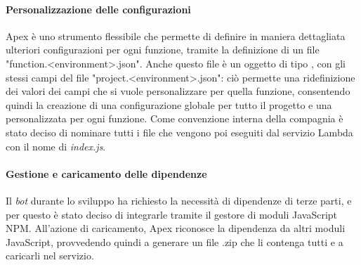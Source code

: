 \paragraph*{Personalizzazione delle configurazioni} Apex è uno strumento
flessibile che permette di definire in maniera dettagliata ulteriori
configurazioni per ogni funzione, tramite la definizione di un file
"function.<environment>.json". Anche questo file è un oggetto di tipo
, con gli stessi campi del file
"project.<environment>.json": ciò permette una ridefinizione dei valori dei
campi che si vuole personalizzare per quella funzione, consentendo quindi
la creazione di una configurazione globale per tutto il progetto e una
personalizzata per ogni funzione.
Come convenzione interna della compagnia è stato deciso di nominare tutti i
file che vengono poi eseguiti dal servizio Lambda con il nome di
\textit{index.js}.


\paragraph*{Gestione e caricamento delle dipendenze} Il \textit{bot} durante lo
sviluppo ha richiesto la necessità di dipendenze di terze parti, e per questo è
stato deciso di integrarle tramite il gestore di moduli JavaScript NPM.
All'azione di caricamento, Apex riconosce la dipendenza da altri moduli
JavaScript, provvedendo quindi a generare un file .zip che li contenga tutti e
a caricarli nel servizio.



